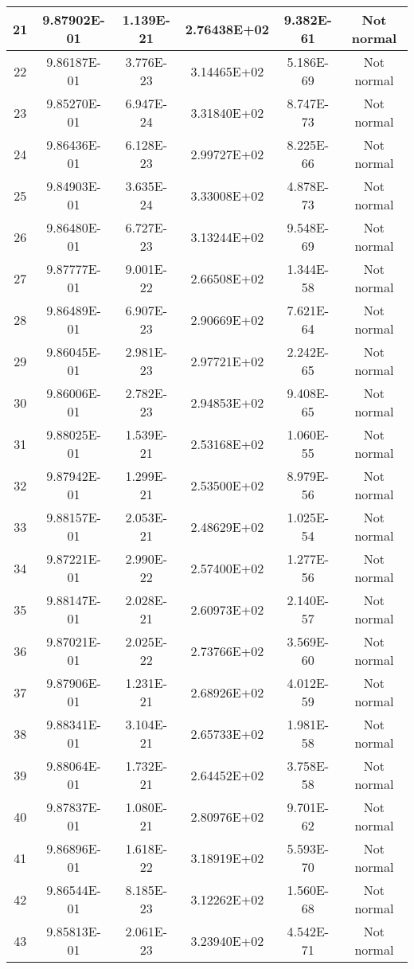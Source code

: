 \begin{table}[h]
\begin{tabular}{|c|c|c|c|c|c|}
		21 & 9.87902E-01 & 1.139E-21 & 2.76438E+02 & 9.382E-61 & Not normal\\\hline
		22 & 9.86187E-01 & 3.776E-23 & 3.14465E+02 & 5.186E-69 & Not normal\\\hline
		23 & 9.85270E-01 & 6.947E-24 & 3.31840E+02 & 8.747E-73 & Not normal\\\hline
		24 & 9.86436E-01 & 6.128E-23 & 2.99727E+02 & 8.225E-66 & Not normal\\\hline
		25 & 9.84903E-01 & 3.635E-24 & 3.33008E+02 & 4.878E-73 & Not normal\\\hline
		26 & 9.86480E-01 & 6.727E-23 & 3.13244E+02 & 9.548E-69 & Not normal\\\hline
		27 & 9.87777E-01 & 9.001E-22 & 2.66508E+02 & 1.344E-58 & Not normal\\\hline
		28 & 9.86489E-01 & 6.907E-23 & 2.90669E+02 & 7.621E-64 & Not normal\\\hline
		29 & 9.86045E-01 & 2.981E-23 & 2.97721E+02 & 2.242E-65 & Not normal\\\hline
		30 & 9.86006E-01 & 2.782E-23 & 2.94853E+02 & 9.408E-65 & Not normal\\\hline
		31 & 9.88025E-01 & 1.539E-21 & 2.53168E+02 & 1.060E-55 & Not normal\\\hline
		32 & 9.87942E-01 & 1.299E-21 & 2.53500E+02 & 8.979E-56 & Not normal\\\hline
		33 & 9.88157E-01 & 2.053E-21 & 2.48629E+02 & 1.025E-54 & Not normal\\\hline
		34 & 9.87221E-01 & 2.990E-22 & 2.57400E+02 & 1.277E-56 & Not normal\\\hline
		35 & 9.88147E-01 & 2.028E-21 & 2.60973E+02 & 2.140E-57 & Not normal\\\hline
		36 & 9.87021E-01 & 2.025E-22 & 2.73766E+02 & 3.569E-60 & Not normal\\\hline
		37 & 9.87906E-01 & 1.231E-21 & 2.68926E+02 & 4.012E-59 & Not normal\\\hline
		38 & 9.88341E-01 & 3.104E-21 & 2.65733E+02 & 1.981E-58 & Not normal\\\hline
		39 & 9.88064E-01 & 1.732E-21 & 2.64452E+02 & 3.758E-58 & Not normal\\\hline
		40 & 9.87837E-01 & 1.080E-21 & 2.80976E+02 & 9.701E-62 & Not normal\\\hline
		41 & 9.86896E-01 & 1.618E-22 & 3.18919E+02 & 5.593E-70 & Not normal\\\hline
		42 & 9.86544E-01 & 8.185E-23 & 3.12262E+02 & 1.560E-68 & Not normal\\\hline
		43 & 9.85813E-01 & 2.061E-23 & 3.23940E+02 & 4.542E-71 & Not normal\\\hline

\end{tabular}
\end{table}
